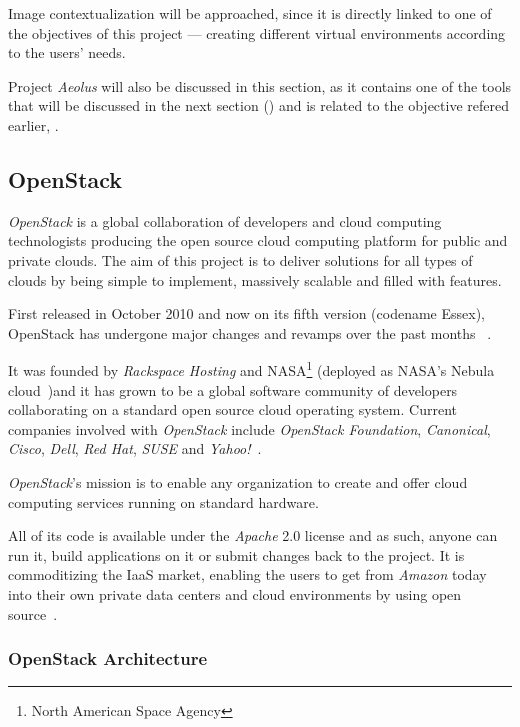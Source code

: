 Image contextualization will be approached, since it is directly linked to one of the objectives of this project --- creating different virtual environments according to the users' needs.

Project \textit{Aeolus} will also be discussed in this section, as it contains one of the tools that will be discussed in the next section () and is related to the objective refered earlier, .

\subsection{OpenStack}\label{subsec:openstack}

\textit{OpenStack} is a global collaboration of developers and cloud computing technologists producing the open source cloud computing platform for public and private clouds. The aim of this project is to deliver solutions for all types of clouds by being simple to implement, massively scalable and filled with features. 

First released in October 2010 and now on its fifth version (codename Essex), OpenStack has undergone major changes and revamps over the past months ~\cite{openstack}.

It was founded by \textit{Rackspace Hosting} and NASA\footnote{North American Space Agency} (deployed as NASA's Nebula cloud~\cite{nasa-nebula})and it has grown to be a global software community of developers collaborating on a standard open source cloud operating system. Current companies involved with \textit{OpenStack} include \textit{OpenStack Foundation}, \textit{Canonical}, \textit{Cisco}, \textit{Dell}, \textit{Red Hat}, \textit{SUSE} and \textit{Yahoo!}~\cite{stackgithub}.

\textit{OpenStack}'s mission is to enable any organization to create and offer cloud computing services running on standard hardware.

All of its code is available under the \textit{Apache} 2.0 license and as such, anyone can run it, build applications on it or submit changes back to the project. It is commoditizing the IaaS market, enabling the users to get from \textit{Amazon} today into their own private data centers and cloud environments by using open source~\cite{stackgithub}.

\subsubsection{OpenStack Architecture}\label{subsubsec:openstack_arch}
  
